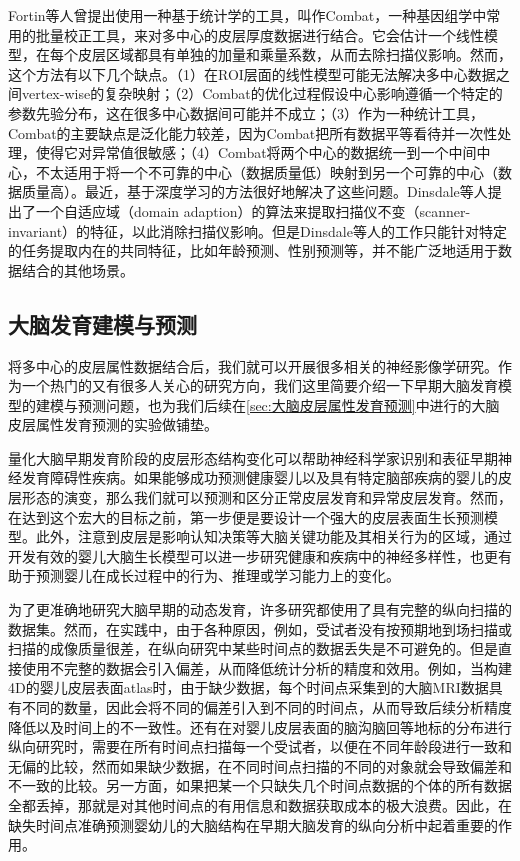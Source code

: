 Fortin等人\cite{fortin2018harmonization}曾提出使用一种基于统计学的工具，叫作Combat，一种基因组学中常用的批量校正工具，来对多中心的皮层厚度数据进行结合。它会估计一个线性模型，在每个皮层区域都具有单独的加量和乘量系数，从而去除扫描仪影响。然而，这个方法有以下几个缺点。（1）在ROI层面的线性模型可能无法解决多中心数据之间vertex-wise的复杂映射；（2）Combat的优化过程假设中心影响遵循一个特定的参数先验分布，这在很多中心数据间可能并不成立；（3）作为一种统计工具，Combat的主要缺点是泛化能力较差，因为Combat把所有数据平等看待并一次性处理，使得它对异常值很敏感；（4）Combat将两个中心的数据统一到一个中间中心，不太适用于将一个不可靠的中心（数据质量低）映射到另一个可靠的中心（数据质量高）。最近，基于深度学习的方法很好地解决了这些问题。Dinsdale\cite{dinsdale2020unlearning}等人提出了一个自适应域（domain adaption）的算法来提取扫描仪不变（scanner-invariant）的特征，以此消除扫描仪影响。但是Dinsdale等人\cite{dinsdale2020unlearning}的工作只能针对特定的任务提取内在的共同特征，比如年龄预测、性别预测等，并不能广泛地适用于数据结合的其他场景。

\subsection{大脑发育建模与预测}
将多中心的皮层属性数据结合后，我们就可以开展很多相关的神经影像学研究。作为一个热门的又有很多人关心的研究方向，我们这里简要介绍一下早期大脑发育模型的建模与预测问题，也为我们后续在\ref{sec:大脑皮层属性发育预测}中进行的大脑皮层属性发育预测的实验做铺垫。

量化大脑早期发育阶段的皮层形态结构变化可以帮助神经科学家识别和表征早期神经发育障碍性疾病。如果能够成功预测健康婴儿以及具有特定脑部疾病的婴儿的皮层形态的演变，那么我们就可以预测和区分正常皮层发育和异常皮层发育。然而，在达到这个宏大的目标之前，第一步便是要设计一个强大的皮层表面生长预测模型。此外，注意到皮层是影响认知决策等大脑关键功能及其相关行为的区域，通过开发有效的婴儿大脑生长模型可以进一步研究健康和疾病中的神经多样性，也更有助于预测婴儿在成长过程中的行为、推理或学习能力上的变化\cite{gilmore2007regional}。

为了更准确地研究大脑早期的动态发育，许多研究都使用了具有完整的纵向扫描的数据集。然而，在实践中，由于各种原因，例如，受试者没有按预期地到场扫描或扫描的成像质量很差，在纵向研究中某些时间点的数据丢失是不可避免的。但是直接使用不完整的数据会引入偏差，从而降低统计分析的精度和效用。例如，当构建4D的婴儿皮层表面atlas时，由于缺少数据，每个时间点采集到的大脑MRI数据具有不同的数量\cite{wu2019construction}，因此会将不同的偏差引入到不同的时间点，从而导致后续分析精度降低以及时间上的不一致性。还有在对婴儿皮层表面的脑沟脑回等地标的分布进行纵向研究时\cite{duan2019exploring}，需要在所有时间点扫描每一个受试者，以便在不同年龄段进行一致和无偏的比较，然而如果缺少数据，在不同时间点扫描的不同的对象就会导致偏差和不一致的比较。另一方面，如果把某一个只缺失几个时间点数据的个体的所有数据全都丢掉，那就是对其他时间点的有用信息和数据获取成本的极大浪费。因此，在缺失时间点准确预测婴幼儿的大脑结构在早期大脑发育的纵向分析中起着重要的作用\cite{meng2017can}。

